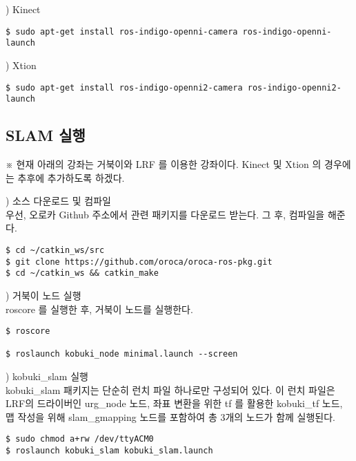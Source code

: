 \vspace{\baselineskip}
\noindent
{}
\thenum) Kinect

\vspace{\baselineskip}
\begin{lstlisting}[language=ROS]
$ sudo apt-get install ros-indigo-openni-camera ros-indigo-openni-launch
\end{lstlisting}


\vspace{\baselineskip}
\noindent
{}
\thenum) Xtion

\vspace{\baselineskip}
\begin{lstlisting}[language=ROS]
$ sudo apt-get install ros-indigo-openni2-camera ros-indigo-openni2-launch
\end{lstlisting}


\subsection{SLAM 실행}

※ 현재 아래의 강좌는 거북이와 LRF 를 이용한 강좌이다. Kinect 및 Xtion 의 경우에는 추후에 추가하도록 하겠다.

\setcounter{num}{0}

\vspace{\baselineskip}
\noindent
{}
\thenum) 소스 다운로드 및 컴파일\\
우선, 오로카 Github 주소에서 관련 패키지를 다운로드 받는다. 그 후, 컴파일을 해준다.
\vspace{\baselineskip}
\begin{lstlisting}[language=ROS]
$ cd ~/catkin_ws/src
$ git clone https://github.com/oroca/oroca-ros-pkg.git
$ cd ~/catkin_ws && catkin_make
\end{lstlisting}

\vspace{\baselineskip}
\noindent
{}
\thenum) 거북이 노드 실행\\
roscore 를 실행한 후, 거북이 노드를 실행한다.

\vspace{\baselineskip}
\begin{lstlisting}[language=ROS]
$ roscore

$ roslaunch kobuki_node minimal.launch --screen
\end{lstlisting}

\vspace{\baselineskip}
\noindent
{}
\thenum) kobuki\_slam 실행\\
kobuki\_slam 패키지는 단순히 런치 파일 하나로만 구성되어 있다. 이 런치 파일은 LRF의 드라이버인 urg\_node 노드, 좌표 변환을 위한 tf 를 활용한 kobuki\_tf 노드, 맵 작성을 위해 slam\_gmapping 노드를 포함하여 총 3개의 노드가 함께 실행된다.
\vspace{\baselineskip}
\begin{lstlisting}[language=ROS]
$ sudo chmod a+rw /dev/ttyACM0
$ roslaunch kobuki_slam kobuki_slam.launch
\end{lstlisting}

